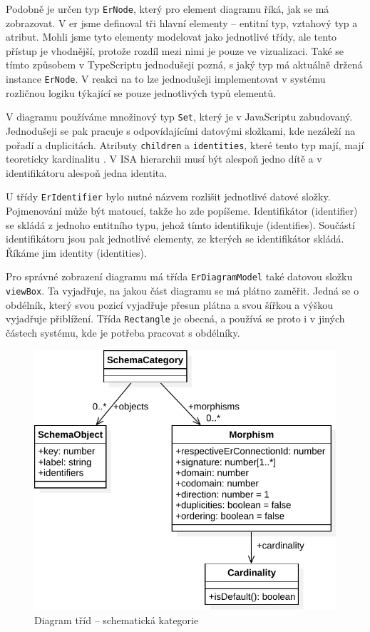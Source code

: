Podobně je určen typ \texttt{ErNode}, který pro element diagramu říká, jak se má zobrazovat.
V \acrshort{er} jsme definoval tři hlavní elementy -- entitní typ, vztahový typ a atribut.
Mohli jsme tyto elementy modelovat jako jednotlivé třídy, ale tento přístup je vhodnější, protože rozdíl mezi nimi je pouze ve vizualizaci.
Také se tímto způsobem v TypeScriptu jednodušeji pozná, s jaký typ má aktuálně držená instance \texttt{ErNode}.
V reakci na to lze jednodušeji implementovat v systému rozličnou logiku týkající se pouze jednotlivých typů elementů.

V diagramu používáme množinový typ \texttt{Set}, který je v JavaScriptu zabudovaný.
Jednodušeji se pak pracuje s odpovídajícími datovými složkami, kde nezáleží na pořadí a duplicitách.
Atributy \texttt{children} a \texttt{identities}, které tento typ mají, mají teoreticky kardinalitu \onemany{}.
V ISA hierarchii musí být alespoň jedno dítě a v identifikátoru alespoň jedna identita.

U třídy \texttt{ErIdentifier} bylo nutné názvem rozlišit jednotlivé datové složky.
Pojmenování může být matoucí, takže ho zde popíšeme.
Identifikátor (identifier) se skládá z jednoho entitního typu, jehož tímto identifikuje (identifies).
Součástí identifikátoru jsou pak jednotlivé elementy, ze kterých se identifikátor skládá.
Říkáme jim identity (identities).

Pro správné zobrazení diagramu má třída \texttt{ErDiagramModel} také datovou složku \texttt{viewBox}.
Ta vyjadřuje, na jakou část diagramu se má plátno zaměřit.
Jedná se o obdélník, který svou pozicí vyjadřuje přesun plátna a svou šířkou a výškou vyjadřuje přiblížení.
Třída \texttt{Rectangle} je obecná, a používá se proto i v jiných částech systému, kde je potřeba pracovat s obdélníky.


\begin{figure}[!htb]
  \centering
  \includegraphics[width=\maxwidth{\textwidth}]{../img/diagrams/schemcat-class-diagram.pdf}
  \caption{Diagram tříd -- schematická kategorie}
  \label{fig:schemcat-class-diagram}
\end{figure}

